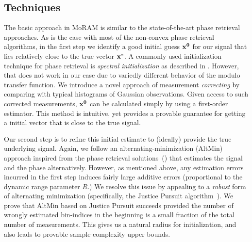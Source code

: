 \subsection{Techniques}

The basic approach in MoRAM is similar to the state-of-the-art phase retrieval approaches. As is the case with most of the non-convex phase retrieval algorithms, in the first step we identify a good initial guess $\mathbf{x^0}$ for our signal that lies relatively close to the true vector $\mathbf{x^*}$. A commonly used initialization technique for phase retrieval is \emph{spectral initialization} as described in \cite{netrapalli2013phase}. However, that does not work in our case due to variedly different behavior of the modulo transfer function. %
We introduce a novel approach of measurement \emph{correcting} by comparing with typical histograms of Gaussian observations. Given access to such corrected measurements, $\mathbf{x^0}$ can be calculated simply by using a first-order estimator. This method is intuitive, yet provides %
	a provable guarantee for getting a initial vector that is close to the true signal. 

Our second step is to refine this initial estimate to (ideally) provide the true underlying signal. Again, we follow an alternating-minimization (AltMin) approach inspired from the phase retrieval solutions~(\cite{netrapalli2013phase}) that estimates the signal and the phase alternatively. However, as mentioned above, any estimation errors incurred in the first step induces fairly large additive errors (proportional to the dynamic range parameter $R$.) We resolve this issue by appealing to a \emph{robust} form of alternating minimization (specifically, the Justice Pursuit algorithm~\cite{Laska2009}). We prove that AltMin based on Justice Pursuit succeeds provided the number of wrongly estimated bin-indices in the beginning is a small fraction of the total number of measurements. This gives us a natural radius for initialization, and also leads to provable sample-complexity upper bounds.   %

